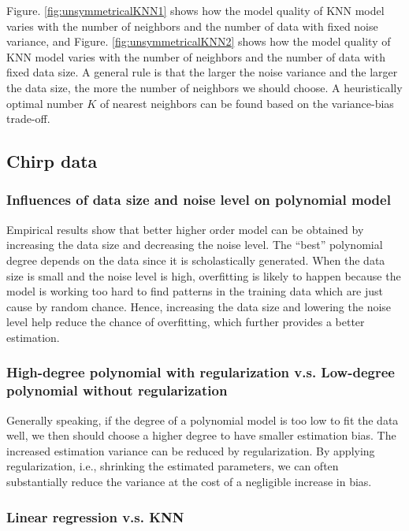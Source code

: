 \documentclass[]{article}
\begin{document}
Figure. \ref{fig:unsymmetricalKNN1} shows how the model quality of KNN model varies with the number of neighbors and the number of data with fixed noise variance, and Figure. \ref{fig:unsymmetricalKNN2} shows how the model quality of KNN model varies with the number of neighbors and the number of data with fixed data size. A general rule is that the larger the noise variance and the larger the data size, the more the number of neighbors we should choose. A heuristically optimal number $K$ of nearest neighbors can be found based on the variance-bias trade-off. 

\subsection{Chirp data}

\subsubsection{Influences of data size and noise level on polynomial model}

Empirical results show that better higher order model can be obtained by increasing the data size and decreasing the noise level. The ``best'' polynomial degree depends on the data since it is scholastically generated. When the data size is small and the noise level is high, overfitting is likely to happen because the model is working too hard to find patterns in the training data which are just cause by random chance. Hence, increasing the data size and lowering the noise level help reduce the chance of overfitting, which further provides a better estimation.

\subsubsection{High-degree polynomial with regularization v.s. Low-degree polynomial without regularization}

Generally speaking, if the degree of a polynomial model is too low to fit the data well, we then should choose a higher degree to have smaller estimation bias. The increased estimation variance can be reduced by regularization. By applying regularization, i.e., shrinking the estimated parameters, we can often substantially reduce the variance at the cost of a negligible increase in bias. 

\subsubsection{Linear regression v.s. KNN}
\end{document}
